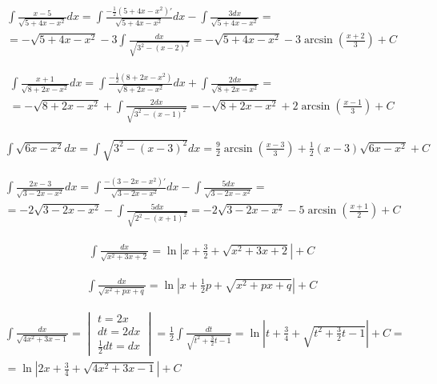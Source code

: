 
\begin{gather*}\int \frac{x-5}{\sqrt{5+4x-x^2}}dx=\int \frac{-\frac{1}{2}(5+4x-x^2)'}{\sqrt{5+4x-x^2}}dx - \int \frac{3dx}{\sqrt{5+4x-x^2}}= \\  = -\sqrt{5+4x-x^2}-3\int \frac{dx}{\sqrt{3^2-(x-2)^2}} = -\sqrt{5+4x-x^2}-3\arcsin\left(\frac{x+2}{3}\right)+C \end{gather*}



\begin{gather*}\int \frac{x+1}{\sqrt{8+2x-x^2}}dx = \int \frac{-\frac{1}{2}(8+2x-x^2)}{\sqrt{8+2x-x^2}}dx+\int \frac{2dx}{\sqrt{8+2x-x^2}}= \\  =-\sqrt{8+2x-x^2}+\int \frac{2dx}{\sqrt{3^2-(x-1)^2}}=-\sqrt{8+2x-x^2}+2\arcsin\left(\frac{x-1}{3}\right)+C \end{gather*}



\begin{gather*}\int \sqrt{6x-x^2}dx = \int \sqrt{3^2-(x-3)^2}dx = \frac{9}{2}\arcsin \left(\frac{x-3}{3}\right)+\frac{1}{2}(x-3)\sqrt{6x-x^2}+C \end{gather*}



\begin{gather*}\int \frac{2x-3}{\sqrt{3-2x-x^2}}dx = \int \frac{-(3-2x-x^2)'}{\sqrt{3-2x-x^2}}dx - \int \frac{5dx}{\sqrt{3-2x-x^2}}  = \\  = -2\sqrt{3-2x-x^2}-\int \frac{5dx}{\sqrt{2^2-(x+1)^2}} = -2\sqrt{3-2x-x^2}-5\arcsin\left(\frac{x+1}{2}\right)+C \end{gather*}



\begin{gather*}\int \frac{dx}{\sqrt{x^2+3x+2}} = \ln|x+\frac{3}{2}+\sqrt{x^2+3x+2}|+C\end{gather*}

  \begin{gather*}\int \frac{dx}{\sqrt{x^2+px+q}} = \ln|x+\tfrac{1}{2}p+\sqrt{x^2+px+q}|+C\end{gather*}



\begin{gather*}\int \frac{dx}{\sqrt{4x^2+3x-1}} = \begin{vmatrix} t=2x \\ dt=2dx \\ \frac{1}{2}dt=dx \end{vmatrix} = \frac{1}{2}\int \frac{dt}{\sqrt{t^2+\frac{3}{2}t-1}} = \ln|t+\frac{3}{4}+\sqrt{t^2+\tfrac{3}{2}t-1}|+C = \\ = \ln|2x+\frac{3}{4}+\sqrt{4x^2+3x-1}|+C\end{gather*}


